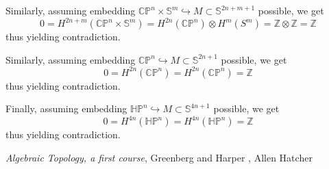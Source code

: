 \documentclass[8pt]{article} %
\begin{document}
\begin{enumerate}[label=\bfseries \arabic*.]
{		Similarly, assuming embedding $\mathbb{CP}^n\times\mathbb{S}^m\hookrightarrow M\subset\mathbb{S}^{2n+m+1}$
		possible, we get \[0=H^{2n+m}(\mathbb{CP}^n\times\mathbb{S}^m)=H^{2n}(\mathbb{CP}^n)
		\otimes H^m(S^m)=\mathbb{Z}\otimes\mathbb{Z}=\mathbb{Z}\] thus yielding contradiction. 

		Similarly, assuming embedding $\mathbb{CP}^n\hookrightarrow M\subset\mathbb{S}^{2n+1}$
		possible, we get \[0=H^{2n}(\mathbb{CP}^n)=H^{2n}(\mathbb{CP}^n)=\mathbb{Z}\] thus yielding contradiction. 

		Finally, assuming embedding $\mathbb{HP}^n\hookrightarrow M\subset\mathbb{S}^{4n+1}$
		possible, we get \[0=H^{4n}(\mathbb{HP}^n)=H^{4n}(\mathbb{HP}^n)=\mathbb{Z}\] thus yielding contradiction. 
		}
\end{enumerate}
\begin{thebibliography}{9}
	 {\em Algebraic Topology, a first course}, Greenberg and Harper
	, Allen Hatcher
\end{thebibliography}
\end{document}
